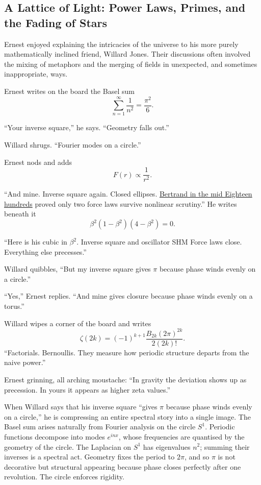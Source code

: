 \newpage
\subsection*{A Lattice of Light: Power Laws, Primes, and the Fading of Stars}

Ernest enjoyed explaining the intricacies of the universe to his more purely
mathematically inclined friend, Willard Jones. Their discussions often involved
the mixing of metaphors and the merging of fields in unexpected, and sometimes
inappropriate, ways.

Ernest writes on the board the Basel sum
\[
\sum_{n=1}^{\infty}\frac{1}{n^2}=\frac{\pi^2}{6}.
\]

“Your inverse square,” he says. “Geometry falls out.”

\noindent
Willard shrugs. “Fourier modes on a circle.”

\noindent
Ernest nods and adds
\[
F(r)\propto \frac{1}{r^2}.
\]

“And mine. Inverse square again. Closed ellipses.
\href{https://leelemacjames.github.io/bertrandTheoremBetaScape/}{Bertrand in the mid Eighteen hundreds} proved only two force laws survive nonlinear scrutiny.” He writes beneath it
\[
\beta^2(1-\beta^2)(4-\beta^2)=0.
\]

“Here is his cubic in $\beta^2$.
Inverse square and oscillator SHM Force laws close. Everything else precesses.”

\noindent
Willard quibbles, “But my inverse square gives $\pi$
because phase winds evenly on a circle.”

\noindent
“Yes,” Ernest replies. “And mine gives closure because phase winds evenly
on a torus.”

Willard wipes a corner of the board and writes
\[
\zeta(2k)=(-1)^{k+1}\frac{B_{2k}(2\pi)^{2k}}{2(2k)!}.
\]
“Factorials. Bernoullis.
They measure how periodic structure departs from the naive power.”

\noindent
Ernest grinning, all arching moustache: “In gravity the deviation shows up as precession.
In yours it appears as higher zeta values.”

\begin{tcolorbox}[title=Willard's Circle: Fourier and the Basel Inverse Square,
colback=gray!5!white,colframe=black!70!white]

When Willard says that his inverse square “gives $\pi$ because phase winds evenly on a circle,”
he is compressing an entire spectral story into a single image. The Basel sum arises naturally from Fourier analysis on the circle $S^1$.
Periodic functions decompose into modes $e^{inx}$,
whose frequencies are quantised by the geometry of the circle.
The Laplacian on $S^1$ has eigenvalues $n^2$;
summing their inverses is a spectral act.
Geometry fixes the period to $2\pi$,
and so $\pi$ is not decorative but structural appearing because phase closes perfectly after one revolution.
The circle enforces rigidity.
\end{tcolorbox}

